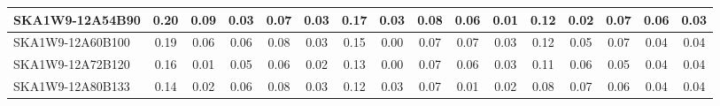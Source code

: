 \begin{table}[H]
{{\begin{tabular}{|lccccc||ccccc||ccccc|}
SKA1W9-12A54B90 & 0.20 \cellcolor{blue!60.00} & 0.09 \cellcolor{red!60.00} & 0.03 \cellcolor{green!18.00} & 0.07 \cellcolor{orange!39.00} & 0.03 \cellcolor{purple!60.00} & 0.17 \cellcolor{blue!60.00} & 0.03 \cellcolor{red!33.75} & 0.08 \cellcolor{green!60.00} & 0.06 \cellcolor{orange!48.00} & 0.01 \cellcolor{purple!18.00} & 0.12 \cellcolor{blue!60.00} & 0.02 \cellcolor{red!18.00} & 0.07 \cellcolor{green!60.00} & 0.06 \cellcolor{orange!60.00} & 0.03 \cellcolor{purple!18.00}\\ \hline 
SKA1W9-12A60B100 & 0.19 \cellcolor{blue!54.00} & 0.06 \cellcolor{red!44.25} & 0.06 \cellcolor{green!43.20} & 0.08 \cellcolor{orange!60.00} & 0.03 \cellcolor{purple!60.00} & 0.15 \cellcolor{blue!49.50} & 0.00 \cellcolor{red!18.00} & 0.07 \cellcolor{green!39.00} & 0.07 \cellcolor{orange!54.00} & 0.03 \cellcolor{purple!60.00} & 0.12 \cellcolor{blue!60.00} & 0.05 \cellcolor{red!39.00} & 0.07 \cellcolor{green!60.00} & 0.04 \cellcolor{orange!18.00} & 0.04 \cellcolor{purple!28.50}\\ \hline 
SKA1W9-12A72B120 & 0.16 \cellcolor{blue!36.00} & 0.01 \cellcolor{red!18.00} & 0.05 \cellcolor{green!34.80} & 0.06 \cellcolor{orange!18.00} & 0.02 \cellcolor{purple!18.00} & 0.13 \cellcolor{blue!39.00} & 0.00 \cellcolor{red!18.00} & 0.07 \cellcolor{green!39.00} & 0.06 \cellcolor{orange!48.00} & 0.03 \cellcolor{purple!60.00} & 0.11 \cellcolor{blue!53.00} & 0.06 \cellcolor{red!46.00} & 0.05 \cellcolor{green!18.00} & 0.04 \cellcolor{orange!18.00} & 0.04 \cellcolor{purple!28.50}\\ \hline 
SKA1W9-12A80B133 & 0.14 \cellcolor{blue!24.00} & 0.02 \cellcolor{red!23.25} & 0.06 \cellcolor{green!43.20} & 0.08 \cellcolor{orange!60.00} & 0.03 \cellcolor{purple!60.00} & 0.12 \cellcolor{blue!33.75} & 0.03 \cellcolor{red!33.75} & 0.07 \cellcolor{green!39.00} & 0.01 \cellcolor{orange!18.00} & 0.02 \cellcolor{purple!39.00} & 0.08 \cellcolor{blue!32.00} & 0.07 \cellcolor{red!53.00} & 0.06 \cellcolor{green!39.00} & 0.04 \cellcolor{orange!18.00} & 0.04 \cellcolor{purple!28.50}\\ \hline 
\end{tabular}}
\vspace{-0.300000cm}
\hspace{1cm} 
}
\end{table}
